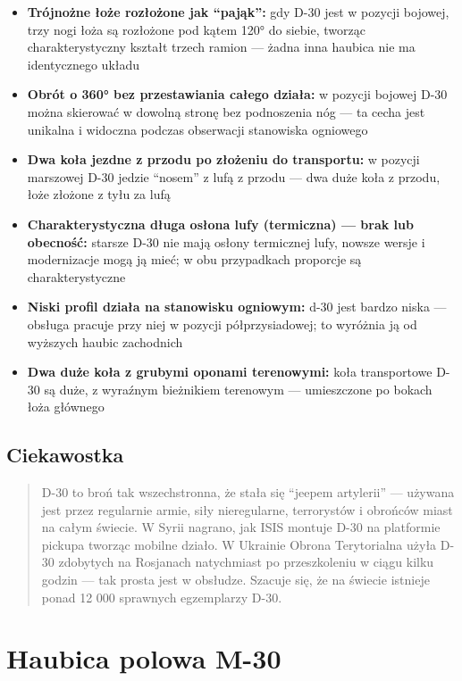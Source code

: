 \documentclass[12pt,oneside]{book}
\providecommand{\tightlist}{%
  \setlength{\itemsep}{0pt}\setlength{\parskip}{0pt}}
\begin{document}
\begin{itemize}
\tightlist
\item
  \textbf{Trójnożne łoże rozłożone jak ``pająk'':} gdy D-30 jest w
  pozycji bojowej, trzy nogi łoża są rozłożone pod kątem 120° do siebie,
  tworząc charakterystyczny kształt trzech ramion --- żadna inna haubica
  nie ma identycznego układu
\item
  \textbf{Obrót o 360° bez przestawiania całego działa:} w pozycji
  bojowej D-30 można skierować w dowolną stronę bez podnoszenia nóg ---
  ta cecha jest unikalna i widoczna podczas obserwacji stanowiska
  ogniowego
\item
  \textbf{Dwa koła jezdne z przodu po złożeniu do transportu:} w pozycji
  marszowej D-30 jedzie ``nosem'' z lufą z przodu --- dwa duże koła z
  przodu, łoże złożone z tyłu za lufą
\item
  \textbf{Charakterystyczna długa osłona lufy (termiczna) --- brak lub
  obecność:} starsze D-30 nie mają osłony termicznej lufy, nowsze wersje
  i modernizacje mogą ją mieć; w obu przypadkach proporcje są
  charakterystyczne
\item
  \textbf{Niski profil działa na stanowisku ogniowym:} d-30 jest bardzo
  niska --- obsługa pracuje przy niej w pozycji półprzysiadowej; to
  wyróżnia ją od wyższych haubic zachodnich
\item
  \textbf{Dwa duże koła z grubymi oponami terenowymi:} koła transportowe
  D-30 są duże, z wyraźnym bieżnikiem terenowym --- umieszczone po
  bokach łoża głównego
\end{itemize}

\subsection{Ciekawostka}\label{ciekawostka-26}

\begin{quote}
D-30 to broń tak wszechstronna, że stała się ``jeepem artylerii'' ---
używana jest przez regularnie armie, siły nieregularne, terrorystów i
obrońców miast na całym świecie. W Syrii nagrano, jak ISIS montuje D-30
na platformie pickupa tworząc mobilne działo. W Ukrainie Obrona
Terytorialna użyła D-30 zdobytych na Rosjanach natychmiast po
przeszkoleniu w ciągu kilku godzin --- tak prosta jest w obsłudze.
Szacuje się, że na świecie istnieje ponad 12 000 sprawnych egzemplarzy
D-30.
\end{quote}

\section{Haubica polowa M-30}\label{haubica-polowa-m-30}
\end{document}
